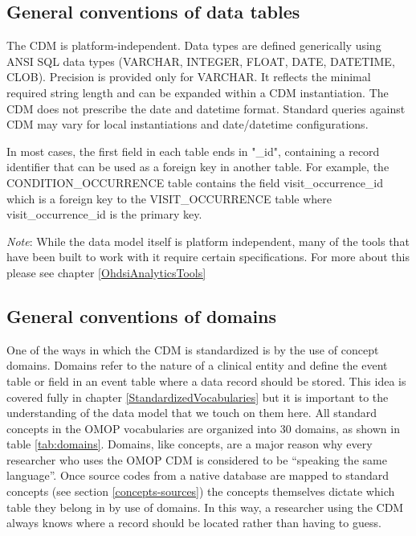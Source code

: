 \documentclass[11pt]{book}
\theoremstyle{definition}
\theoremstyle{definition}
\theoremstyle{definition}
\theoremstyle{remark}
\begin{document}
\hypertarget{general-conventions-of-data-tables}{%
\subsection{General conventions of data tables}\label{general-conventions-of-data-tables}}

The CDM is platform-independent. Data types are defined generically using ANSI SQL data types (VARCHAR, INTEGER, FLOAT, DATE, DATETIME, CLOB). Precision is provided only for VARCHAR. It reflects the minimal required string length and can be expanded within a CDM instantiation. The CDM does not prescribe the date and datetime format. Standard queries against CDM may vary for local instantiations and date/datetime configurations.

In most cases, the first field in each table ends in "\_id", containing a record identifier that can be used as a foreign key in another table. For example, the CONDITION\_OCCURRENCE table contains the field visit\_occurrence\_id which is a foreign key to the VISIT\_OCCURRENCE table where visit\_occurrence\_id is the primary key.

\emph{Note}: While the data model itself is platform independent, many of the tools that have been built to work with it require certain specifications. For more about this please see chapter \ref{OhdsiAnalyticsTools}

\hypertarget{general-conventions-of-domains}{%
\subsection{General conventions of domains}\label{general-conventions-of-domains}}

One of the ways in which the CDM is standardized is by the use of concept domains. Domains refer to the nature of a clinical entity and define the event table or field in an event table where a data record should be stored. This idea is covered fully in chapter \ref{StandardizedVocabularies} but it is important to the understanding of the data model that we touch on them here. All standard concepts in the OMOP vocabularies are organized into 30 domains, as shown in table \ref{tab:domains}. Domains, like concepts, are a major reason why every researcher who uses the OMOP CDM is considered to be ``speaking the same language''. Once source codes from a native database are mapped to standard concepts (see section \ref{concepts-sources}) the concepts themselves dictate which table they belong in by use of domains. In this way, a researcher using the CDM always knows where a record should be located rather than having to guess.
\end{document}
